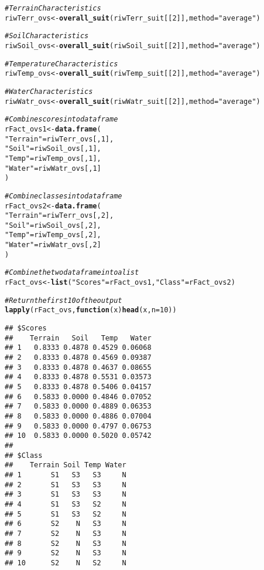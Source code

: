 \documentclass[11pt,fleqn]{article}\usepackage[]{graphicx}\usepackage[]{color}
\makeatletter
\newcommand{\hlnum}[1]{\textcolor[rgb]{0.686,0.059,0.569}{#1}}%
\newcommand{\hlstr}[1]{\textcolor[rgb]{0.192,0.494,0.8}{#1}}%
\newcommand{\hlcom}[1]{\textcolor[rgb]{0.678,0.584,0.686}{\textit{#1}}}%
\newcommand{\hlstd}[1]{\textcolor[rgb]{0.345,0.345,0.345}{#1}}%
\newcommand{\hlkwa}[1]{\textcolor[rgb]{0.161,0.373,0.58}{\textbf{#1}}}%
\newcommand{\hlkwb}[1]{\textcolor[rgb]{0.69,0.353,0.396}{#1}}%
\newcommand{\hlkwc}[1]{\textcolor[rgb]{0.333,0.667,0.333}{#1}}%
\newcommand{\hlkwd}[1]{\textcolor[rgb]{0.737,0.353,0.396}{\textbf{#1}}}%
\newenvironment{kframe}{%
 \def\at@end@of@kframe{}%
 \ifinner\ifhmode%
  \def\at@end@of@kframe{\end{minipage}}%
  \begin{minipage}{\columnwidth}%
 \fi\fi%
 \def\FrameCommand##1{\hskip\@totalleftmargin \hskip-\fboxsep
 \colorbox{shadecolor}{##1}\hskip-\fboxsep
     \hskip-\linewidth \hskip-\@totalleftmargin \hskip\columnwidth}%
 \MakeFramed {\advance\hsize-\width
   \@totalleftmargin\z@ \linewidth\hsize
   \@setminipage}}%
 {\par\unskip\endMakeFramed%
 \at@end@of@kframe}
\newenvironment{knitrout}{}{} %
\makeatother
\begin{document}
\begin{knitrout}
\color{fgcolor}\begin{kframe}
\begin{alltt}
\hlcom{# Terrain Characteristics}
\hlstd{riwTerr_ovs} \hlkwb{<-} \hlkwd{overall_suit}\hlstd{(riwTerr_suit[[}\hlnum{2}\hlstd{]],} \hlkwc{method} \hlstd{=} \hlstr{"average"}\hlstd{)}

\hlcom{# Soil Characteristics}
\hlstd{riwSoil_ovs} \hlkwb{<-} \hlkwd{overall_suit}\hlstd{(riwSoil_suit[[}\hlnum{2}\hlstd{]],} \hlkwc{method} \hlstd{=} \hlstr{"average"}\hlstd{)}

\hlcom{# Temperature Characteristics}
\hlstd{riwTemp_ovs} \hlkwb{<-} \hlkwd{overall_suit}\hlstd{(riwTemp_suit[[}\hlnum{2}\hlstd{]],} \hlkwc{method} \hlstd{=} \hlstr{"average"}\hlstd{)}

\hlcom{# Water Characteristics}
\hlstd{riwWatr_ovs} \hlkwb{<-} \hlkwd{overall_suit}\hlstd{(riwWatr_suit[[}\hlnum{2}\hlstd{]],} \hlkwc{method} \hlstd{=} \hlstr{"average"}\hlstd{)}

\hlcom{# Combine scores into data frame}
\hlstd{rFact_ovs1} \hlkwb{<-} \hlkwd{data.frame}\hlstd{(}
  \hlstr{"Terrain"} \hlstd{= riwTerr_ovs[,} \hlnum{1}\hlstd{],}
  \hlstr{"Soil"} \hlstd{= riwSoil_ovs[,} \hlnum{1}\hlstd{],}
  \hlstr{"Temp"} \hlstd{= riwTemp_ovs[,} \hlnum{1}\hlstd{],}
  \hlstr{"Water"} \hlstd{= riwWatr_ovs[,} \hlnum{1}\hlstd{]}
  \hlstd{)}

\hlcom{# Combine classes into data frame}
\hlstd{rFact_ovs2} \hlkwb{<-} \hlkwd{data.frame}\hlstd{(}
  \hlstr{"Terrain"} \hlstd{= riwTerr_ovs[,} \hlnum{2}\hlstd{],}
  \hlstr{"Soil"} \hlstd{= riwSoil_ovs[,} \hlnum{2}\hlstd{],}
  \hlstr{"Temp"} \hlstd{= riwTemp_ovs[,} \hlnum{2}\hlstd{],}
  \hlstr{"Water"} \hlstd{= riwWatr_ovs[,} \hlnum{2}\hlstd{]}
  \hlstd{)}

\hlcom{# Combine the two data frame into a list}
\hlstd{rFact_ovs} \hlkwb{<-} \hlkwd{list}\hlstd{(}\hlstr{"Scores"} \hlstd{= rFact_ovs1,} \hlstr{"Class"} \hlstd{= rFact_ovs2)}

\hlcom{# Return the first 10 of the output}
\hlkwd{lapply}\hlstd{(rFact_ovs,} \hlkwa{function}\hlstd{(}\hlkwc{x}\hlstd{)} \hlkwd{head}\hlstd{(x,} \hlkwc{n} \hlstd{=} \hlnum{10}\hlstd{))}
\end{alltt}
\begin{verbatim}
## $Scores
##    Terrain   Soil   Temp   Water
## 1   0.8333 0.4878 0.4529 0.06068
## 2   0.8333 0.4878 0.4569 0.09387
## 3   0.8333 0.4878 0.4637 0.08655
## 4   0.8333 0.4878 0.5531 0.03573
## 5   0.8333 0.4878 0.5406 0.04157
## 6   0.5833 0.0000 0.4846 0.07052
## 7   0.5833 0.0000 0.4889 0.06353
## 8   0.5833 0.0000 0.4886 0.07004
## 9   0.5833 0.0000 0.4797 0.06753
## 10  0.5833 0.0000 0.5020 0.05742
## 
## $Class
##    Terrain Soil Temp Water
## 1       S1   S3   S3     N
## 2       S1   S3   S3     N
## 3       S1   S3   S3     N
## 4       S1   S3   S2     N
## 5       S1   S3   S2     N
## 6       S2    N   S3     N
## 7       S2    N   S3     N
## 8       S2    N   S3     N
## 9       S2    N   S3     N
## 10      S2    N   S2     N
\end{verbatim}
\end{kframe}
\end{knitrout}
\end{document}
